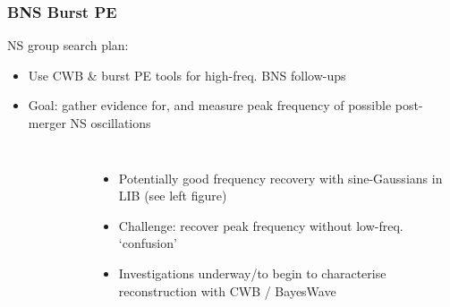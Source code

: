 \documentclass{beamer}
\begin{document}





\begin{frame}
    \frametitle{BNS Burst PE}
    NS group search plan:
    \begin{itemize}
        \item Use CWB \& burst PE tools for high-freq. BNS follow-ups
        \item Goal: gather evidence for, and measure peak frequency of
            possible post-merger NS oscillations
    \end{itemize}

    \begin{columns}[]


        \begin{center}
            \vspace{-0.5cm}
            \begin{figure}
            \end{figure}
        \end{center}


        \begin{itemize}
            \item Potentially good frequency recovery with sine-Gaussians in LIB
                (see left figure)
            \item Challenge: recover peak frequency without low-freq.
                `confusion'
            \item Investigations underway/to begin to characterise
                reconstruction with CWB / BayesWave
        \end{itemize}

    \end{columns}

\end{frame}
\end{document}
